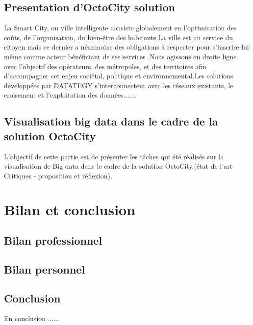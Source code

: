 \documentclass[french, a4paper, 12pt]{report}
\begin{document}
\section{Presentation d’OctoCity solution}
La Smart City, ou ville intelligente consiste globalement en l’optimisation des coûts, de l’organisation, du bien-être des habitants.La ville est au service du citoyen mais ce dernier a néanmoins des obligations à respecter pour s’inscrire lui même comme acteur bénéficiant de ses services .Nous agissons en droite ligne avec l’objectif des opérateurs, des métropoles, et des territoires afin d’accompagner cet enjeu sociétal, politique et environnemental.Les solutions développées par DATATEGY s’interconnectent avec les réseaux existants, le croisement et l’exploitation des données.......
\section{Visualisation big data dans le cadre de la solution OctoCity}
L'objectif de cette partie est de présenter les tâches qui été réalisés sur la visualisation de Big data dans le cadre de la solution OctoCity.(état de l’art- Critiques - proposition et réflexion).

\chapter{ Bilan et conclusion}
\section{Bilan professionnel}
\section{Bilan personnel}
\section{Conclusion}
En conclusion ...... 
\end{document}
